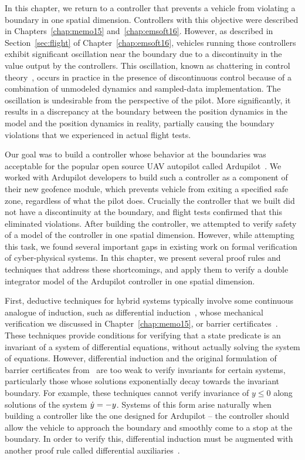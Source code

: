 In this chapter, we return to a controller that prevents a vehicle from
violating a boundary in one spatial dimension. Controllers with this
objective were described in Chapters~\ref{chap:memo15}
and~\ref{chap:emsoft16}. However, as described in Section~\ref{sec:flight}
of Chapter~\ref{chap:emsoft16}, vehicles running those controllers exhibit
significant oscillation near the boundary due to a discontinuity in the
value output by the controllers. This oscillation, known as chattering in
control theory~\cite{utkin06chatter}, occurs in practice in the presence of
discontinuous control because of a combination of unmodeled dynamics and
sampled-data implementation. The oscillation is undesirable from the
perspective of the pilot. More significantly, it results in a discrepancy
at the boundary between the position dynamics in the model and the position
dynamics in reality, partially causing the boundary violations that we
experienced in actual flight tests.

Our goal was to build a controller whose behavior at the boundaries was
acceptable for the popular open source UAV autopilot called
Ardupilot~\cite{ardupilot}. We worked with Ardupilot developers to build
such a controller as a component of their new geofence module, which
prevents vehicle from exiting a specified safe zone, regardless of what the
pilot does. Crucially the controller that we built did not have a
discontinuity at the boundary, and flight tests confirmed that this
eliminated violations. After building the controller, we attempted to
verify safety of a model of the controller in one spatial dimension.
However, while attempting this task, we found several important gaps in
existing work on formal verification of cyber-physical systems. In this
chapter, we present several proof rules and techniques that address these
shortcomings, and apply them to verify a double integrator model of the
Ardupilot controller in one spatial dimension.

First, deductive techniques for hybrid systems typically involve some
continuous analogue of induction, such as differential
induction~\cite{Platzer10DAL}, whose mechanical verification we
discussed in Chapter~\ref{chap:memo15}, or barrier
certificates~\cite{prajna04barrier}. These techniques provide conditions
for verifying that a state predicate is an invariant of a system of
differential equations, without actually solving the system of
equations. However, differential induction and the original formulation of
barrier certificates from~\cite{prajna04barrier} are too weak to verify
invariants for certain systems, particularly those whose solutions
exponentially decay towards the invariant boundary. For example, these
techniques cannot verify invariance of $y \leq 0$ along solutions of the
system $\dot{y} = -y$. Systems of this form arise naturally when building a
controller like the one designed for Ardupilot -- the controller should
allow the vehicle to approach the boundary and smoothly come to a stop at
the boundary. In order to verify this, differential induction must be
augmented with another proof rule called differential
auxiliaries~\cite{Platzer12diffcut}.


